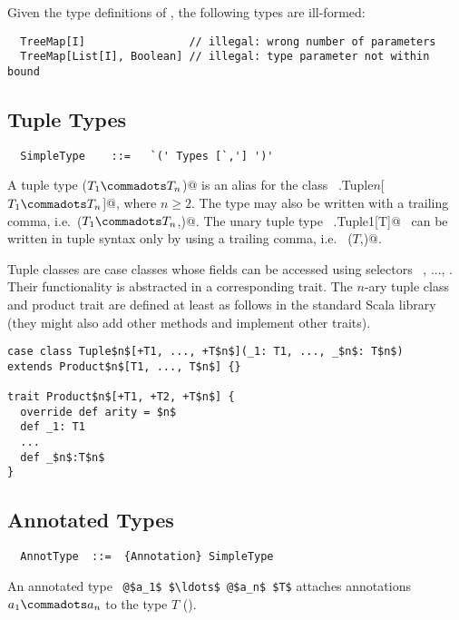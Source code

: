 \example Given the type definitions of ,
the following types are ill-formed:

\begin{lstlisting}
  TreeMap[I]                // illegal: wrong number of parameters
  TreeMap[List[I], Boolean] // illegal: type parameter not within bound
\end{lstlisting}

\subsection{Tuple Types}\label{sec:tuple-types}

\syntax\begin{lstlisting}
  SimpleType    ::=   `(' Types [`,'] ')'
\end{lstlisting}

A tuple type \lstinline@($T_1 \commadots T_n$)@ is an alias for the
class ~\lstinline@scala.Tuple$n$[$T_1 \commadots T_n$]@, where $n \geq
2$.  The type may also be written with a trailing comma, i.e.\
\lstinline@($T_1 \commadots T_n$,)@.  The unary tuple type
~\lstinline@scala.Tuple1[T]@~ can be written in tuple syntax only by
using a trailing comma, i.e. ~\lstinline@($T$,)@. 

Tuple classes are case classes whose fields can be accessed using
selectors ~\code{_1}, ..., \code{_$n$}. Their functionality is
abstracted in a corresponding  trait. The $n$-ary tuple
class and product trait are defined at least as follows in the
standard Scala library (they might also add other methods and
implement other traits).

\begin{lstlisting}
case class Tuple$n$[+T1, ..., +T$n$](_1: T1, ..., _$n$: T$n$) 
extends Product$n$[T1, ..., T$n$] {}

trait Product$n$[+T1, +T2, +T$n$] {
  override def arity = $n$
  def _1: T1
  ...
  def _$n$:T$n$
}
\end{lstlisting}

\subsection{Annotated Types}

\syntax\begin{lstlisting}
  AnnotType  ::=  {Annotation} SimpleType
\end{lstlisting}

An annotated type ~\lstinline^@$a_1$ $\ldots$ @$a_n$ $T$^
attaches annotations $a_1 \commadots a_n$ to the type $T$
().

